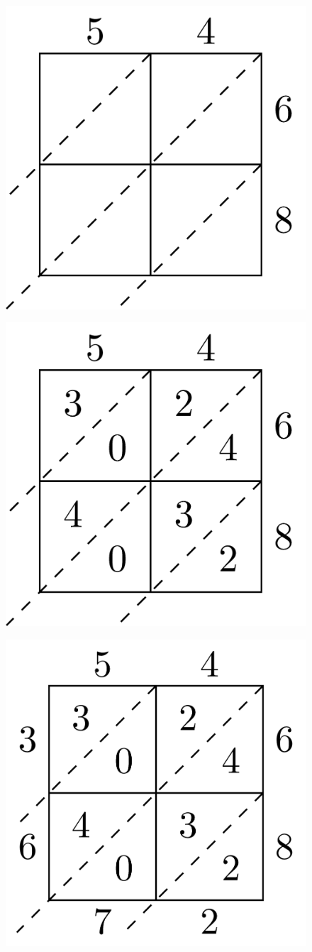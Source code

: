 \documentclass[
]{book}
\theoremstyle{definition}
\theoremstyle{definition}
\theoremstyle{definition}
\theoremstyle{remark}
\begin{document}
\begin{figure}

{\centering \includegraphics[width=0.5\linewidth]{tikz/lattice-multiplication-13-16-1} 

}

\end{figure}
\begin{figure}

{\centering \includegraphics[width=0.5\linewidth]{tikz/lattice-multiplication-13-16-2} 

}

\end{figure}
\begin{figure}

{\centering \includegraphics[width=0.5\linewidth]{tikz/lattice-multiplication-13-16-3} 

}

\end{figure}
\end{document}

